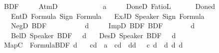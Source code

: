 \begin{isabellebody}
\ BDF\ {\isacharequal}{\kern0pt}\isanewline
\ \ \ \ AtmD\ {\isasymS}\ \ \ \ \ \ \ \ \ \ \ \ {\isacharparenleft}{\kern0pt}{\isachardoublequoteopen}{\isacharunderscore}{\kern0pt}\isactrlsup a{\isachardoublequoteclose}\ {\isacharbrackleft}{\kern0pt}{}{}{}{}{\isacharbrackright}{\kern0pt}\ {}{}{}{\isacharparenright}{\kern0pt}\isanewline
\ \ {\isacharbar}{\kern0pt}\ DoneD\ FatioL\ \ \ \ \ \ \ {\isacharparenleft}{\kern0pt}{\isachardoublequoteopen}Done\isactrlsup d{\isachardoublequoteclose}{\isacharparenright}{\kern0pt}\isanewline
\ \ {\isacharbar}{\kern0pt}\ EntD\ Formula\ Sign\ Formula\isanewline
\ \ {\isacharbar}{\kern0pt}\ ExJD\ Speaker\ Sign\ Formula\isanewline
\ \ {\isacharbar}{\kern0pt}\ NegD\ BDF\ \ \ \ \ \ \ \ \ \ \ {\isacharparenleft}{\kern0pt}{\isachardoublequoteopen}{\isasymnot}\isactrlsup d{\isacharunderscore}{\kern0pt}{\isachardoublequoteclose}\ {\isacharbrackleft}{\kern0pt}{}{}{\isacharbrackright}{\kern0pt}\ {}{}{\isacharparenright}{\kern0pt}\isanewline
\ \ {\isacharbar}{\kern0pt}\ ImpD\ BDF\ BDF\ \ \ \ \ \ \ {\isacharparenleft}{\kern0pt}\ {\isachardoublequoteopen}{\isasymsupset}\isactrlsup d{\isachardoublequoteclose}\ {}{}{\isacharparenright}{\kern0pt}\isanewline
\ \ {\isacharbar}{\kern0pt}\ BelD\ Speaker\ BDF\ \ \ {\isacharparenleft}{\kern0pt}{\isachardoublequoteopen}{\isasymB}\isactrlsup d{\isachardoublequoteclose}{\isacharparenright}{\kern0pt}\isanewline
\ \ {\isacharbar}{\kern0pt}\ DesD\ Speaker\ BDF\ \ \ {\isacharparenleft}{\kern0pt}{\isachardoublequoteopen}{\isasymD}\isactrlsup d{\isachardoublequoteclose}{\isacharparenright}{\kern0pt}\isanewline
\isanewline
\isanewline
%
\isanewline
{}\isamarkupfalse%
\ MapC\ {\isacharcolon}{\kern0pt}{\isacharcolon}{\kern0pt}\ {\isachardoublequoteopen}Formula{\isasymRightarrow}BDF{\isachardoublequoteclose}\ {\isacharparenleft}{\kern0pt}{\isachardoublequoteopen}{\isacharbraceleft}{\kern0pt}{\isacharunderscore}{\kern0pt}{\isacharbraceright}{\kern0pt}\isactrlsup d{\isachardoublequoteclose}{\isacharparenright}{\kern0pt}\ \isanewline
\ \ {\isachardoublequoteopen}{\isacharbraceleft}{\kern0pt}{\isasymphi}\isactrlsup c{\isacharbraceright}{\kern0pt}\isactrlsup d\ {\isacharequal}{\kern0pt}\ {\isasymphi}\isactrlsup a{\isachardoublequoteclose}\ {\isacharbar}{\kern0pt}\ {\isachardoublequoteopen}{\isacharbraceleft}{\kern0pt}{\isasymnot}\isactrlsup c{\isasymphi}{\isacharbraceright}{\kern0pt}\isactrlsup d\ {\isacharequal}{\kern0pt}\ {\isasymnot}\isactrlsup d{\isacharbraceleft}{\kern0pt}{\isasymphi}{\isacharbraceright}{\kern0pt}\isactrlsup d{\isachardoublequoteclose}\ {\isacharbar}{\kern0pt}\ {\isachardoublequoteopen}{\isacharbraceleft}{\kern0pt}{\isasymphi}\ {\isasymsupset}\isactrlsup c\ {\isasympsi}{\isacharbraceright}{\kern0pt}\isactrlsup d\ {\isacharequal}{\kern0pt}\ {\isacharbraceleft}{\kern0pt}{\isasymphi}{\isacharbraceright}{\kern0pt}\isactrlsup d\ {\isasymsupset}\isactrlsup d\ {\isacharbraceleft}{\kern0pt}{\isasympsi}{\isacharbraceright}{\kern0pt}\isactrlsup d{\isachardoublequoteclose}%

\end{isabellebody}
